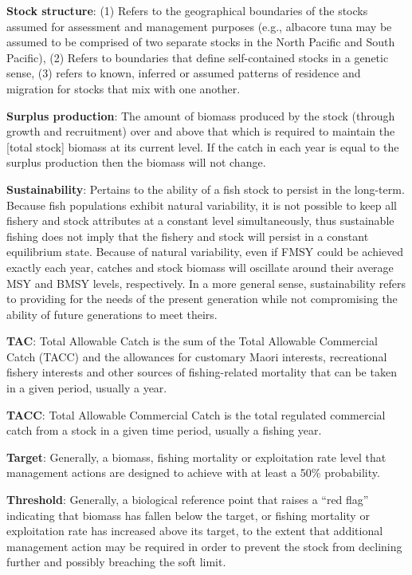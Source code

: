 \documentclass{mpi-plenary}
\theoremstyle{definition}
\theoremstyle{definition}
\theoremstyle{definition}
\theoremstyle{remark}
\begin{document}
\protect\hypertarget{def-stock-structure}{}{} \textbf{Stock structure}:
(1) Refers to the geographical boundaries of the stocks assumed for
assessment and management purposes (e.g., albacore tuna may be assumed
to be comprised of two separate stocks in the North Pacific and South
Pacific), (2) Refers to boundaries that define self-contained stocks in
a genetic sense, (3) refers to known, inferred or assumed patterns of
residence and migration for stocks that mix with one another.

\protect\hypertarget{def-surplus-production}{}{} \textbf{Surplus
production}: The amount of biomass produced by the stock (through growth
and recruitment) over and above that which is required to maintain the
{[}total stock{]} biomass at its current level. If the catch in each
year is equal to the surplus production then the biomass will not
change.

\protect\hypertarget{def-sustainability}{}{} \textbf{Sustainability}:
Pertains to the ability of a fish stock to persist in the long-term.
Because fish populations exhibit natural variability, it is not possible
to keep all fishery and stock attributes at a constant level
simultaneously, thus sustainable fishing does not imply that the fishery
and stock will persist in a constant equilibrium state. Because of
natural variability, even if FMSY could be achieved exactly each year,
catches and stock biomass will oscillate around their average MSY and
BMSY levels, respectively. In a more general sense, sustainability
refers to providing for the needs of the present generation while not
compromising the ability of future generations to meet theirs.

\protect\hypertarget{def-tac}{}{} \textbf{TAC}: Total Allowable Catch is
the sum of the Total Allowable Commercial Catch (TACC) and the
allowances for customary Maori interests, recreational fishery interests
and other sources of fishing-related mortality that can be taken in a
given period, usually a year.~

\protect\hypertarget{def-tacc}{}{} \textbf{TACC}: Total Allowable
Commercial Catch is the total regulated commercial catch from a stock in
a given time period, usually a fishing year.

\protect\hypertarget{def-target}{}{} \textbf{Target}: Generally, a
biomass, fishing mortality or exploitation rate level that management
actions are designed to achieve with at least a 50\% probability.

\protect\hypertarget{def-threshold}{}{} \textbf{Threshold}: Generally, a
biological reference point that raises a ``red flag'' indicating that
biomass has fallen below the target, or fishing mortality or
exploitation rate has increased above its target, to the extent that
additional management action may be required in order to prevent the
stock from declining further and possibly breaching the soft limit.
\end{document}
